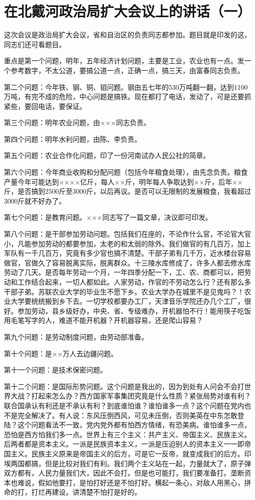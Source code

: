 \section[在北戴河政治局扩大会议上的讲话（一）（一九五八年八月十七日）]{在北戴河政治局扩大会议上的讲话（一）}


这次会议是政治局扩大会议，省和自治区的负责同志都参加。题目就是印发的这，同志们还可看题目。

重点是第一个问题，明年，五年经济计划问题，主要是工业，农业也有一点。发一个参考数字，不太公道，要搞公道一点，正确一点，搞三天，由富春同志负责。

第二个问题：今年铁、钢、铜、钼问题。钢由五七年的530万吨翻一翻，达到1100万吨，有完不成的危险，中心问题是搞铁。现在都打了电话，发动了，可是还要抓紧些，要回电话，要保证。

第三个问题：明年农业问题，由×××同志负责。

第四个问题：明年水利问题，由陈、李负责。

第五个问题：农业合作化问题，印了一份河南试办人民公社的简章。

第六个问题：今年商业收购和分配问题（包括今年粮食处理），由先念负责。粮食产量今年可能达到××××亿斤，每人××斤，明年每人争取达到××斤，后年××斤，是否搞到2500斤至3000斤，以后再议。是否可以无限制的发展粮食，我看超过3000斤就不好办了。

第七个问题：是教育问题。×××同志写了一篇文章，决议即可印发。

第八个问题：是干部参加劳动问题。包括我们在座的，不论作什么官，不论官大官小，凡能参加劳动的都要参加，太老的和太弱的除外。我们做官的有几百万，加上军队有一千几百万，究竟有多少官也搞不清楚。干部子弟有几千万，近水楼台容易做官，官做久了容易脱离实际，脱离群众。十三陵水库修成了，许多人都去修水库劳动了几天。是否每年劳动一个月，一年四季分配一下，工、农、商都可以，把劳动和工作结合起来，一切人都如此。人家劳动，作官的不劳动怎么行？还有那么多干部子弟。苏联农业大学的毕业生不愿下乡。农业大学办在城里不是见鬼吗？！农业大学要统统搬到乡下去。一切学校都要办工厂，天津音乐学院还办几个工厂，很好。参加劳动，县乡级好办，中央、省、专级难办，开机器怕不行！能用筷子吃饭用毛笔写字的人，难道不能开机器？开机器容易，还是爬山容易？

第九个问题：是劳动制度问题，由劳动部准备。

第十个问题：是××万人去边疆问题。

第十一个问题：是技术保密问题。

第十二个问题：是国际形势问题。这个问题是我出的，因为到处有人问会不会打世界大战？打起来怎么办？西方国家军事集团究竟是什么性质？紧张局势对谁有利？联合国承认有利还是不承认有利？到底谁怕谁？谁怕谁多一点？这个问题在党内也不是完全解决了。有人说：东风压倒西风，可见未压倒，否则美英在中东怎敢登陆？这个问题看法不一致，党内党外都有怕西方情绪，有恐美病。谁怕谁多一点，恐怕是西方怕我们多一点。世界上有三个主义：共产主义、帝国主义、民族主义。后两者都是资本主义。一派是民族资本主义，一派是压迫别人的资本主义一一即帝国主义。民族主义原来是帝国主义的后方，可是它一反帝，就变成我们的后方。印埃两国都搞，但是比较对我们有利。我们两个主义站在一起，力量就大了，原子弹双方都有，人民力量我们大，因此不会打。但是也可能打，我们要准备打。垄断资本也难说，假如他要打，是怕打好还是不怕打好。横起一条心，对敌人用黑心，拼命的打，打烂再建设。讲清楚不怕打是好的。

